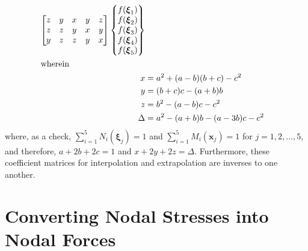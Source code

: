 \begin{subequations}
\begin{align}
\begin{bmatrix}
    z & y & x & y & z \\
    z & z & y & x & y \\
    y & z & z & y & x
    \end{bmatrix} \left\{ \begin{matrix}
    f ( \boldsymbol{\xi}_1 ) \\ 
    f ( \boldsymbol{\xi}_2 ) \\ 
    f ( \boldsymbol{\xi}_3 ) \\ 
    f ( \boldsymbol{\xi}_4 ) \\ 
    f ( \boldsymbol{\xi}_5 )
    \end{matrix} \right\}  \\
    \intertext{wherein}
    x & = a^2 + (a-b)(b+c) - c^2 \\
    y & = (b+c)c - (a+b)b \\
    z & = b^2 - (a-b)c - c^2 \\
    \Delta & = a^2 - (a+b)b - (a-3b)c - c^2
    \end{align}
\end{subequations}
where, as a check, $\sum_{i=1}^5 N_i (\boldsymbol{\xi}_j) = 1$ and $\sum_{i=1}^5 M_i (\boldsymbol{x}_j) = 1$ for $j=1,2,\ldots,5$, and therefore, $a + 2b + 2c = 1$ and $x + 2y + 2z = \Delta$.  Furthermore, these coefficient matrices for interpolation and extrapolation are inverses to one another.  


\section{Converting Nodal Stresses into Nodal Forces}


